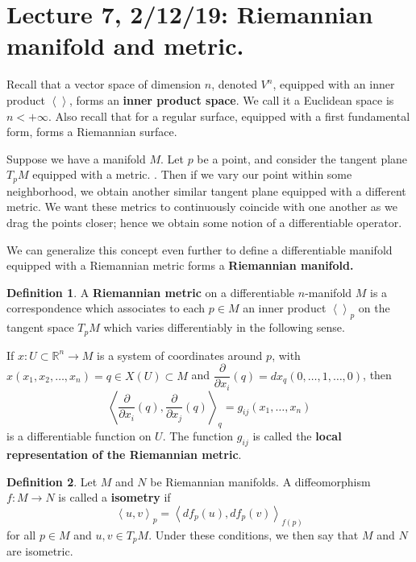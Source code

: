 \documentclass[12pt,letterpaper,boxed]{maths_v5}
\newcommand{\rr}{\mathbb{R}}
\theoremstyle{definition}
\newtheorem{definition}{Definition}[section]
\begin{document}
\section*{Lecture 7, 2/12/19: Riemannian manifold and metric.}
Recall that a vector space of dimension $n$, denoted 
$V^n$, equipped with an inner product $\left< \right>$, forms an \textbf{inner  product  space}. 
We  call it a Euclidean space is $n < +\infty$. Also recall that for a 
regular surface, equipped with a first fundamental form, forms a Riemannian 
surface. 

Suppose we have a manifold $M$. Let $p$ be a point, and consider the tangent 
plane $T_pM$ equipped with a metric. . Then if we vary our point within some neighborhood, we obtain 
another similar tangent plane equipped with a different metric. We want these metrics to 
continuously coincide with one another as we drag the points closer; hence we obtain some 
notion of a differentiable operator. 

We can generalize this concept even further to define a differentiable manifold equipped with 
a Riemannian metric forms a \textbf{Riemannian manifold.}


\begin{definition}
    A \textbf{Riemannian  metric} on a differentiable $n$-manifold $M$ is 
    a correspondence which associates to each $p\in M$ an inner product $\left<  \right>_p$ 
    on the tangent space $T_pM$ which varies differentiably 
    in the following sense. 

    If $x: U \subset \rr^n \to M$ is a system of coordinates around $p$, 
    with $x(x_1, x_2, \dots, x_n) = q \in X(U) \subset M$ 
    and $\dfrac{\partial}{\partial x_i}(q) = dx_q(0, \dots, 1, \dots, 0)$, 
    then 
    \[
        \left< \frac{\partial}{\partial x_i}(q),     \frac{\partial}{\partial x_j}(q) \right>_q
        =
        g_{ij}(x_1, \dots, x_n)
    \] 
    is a differentiable function on $U$. The function $g_{ij}$ is called the \textbf{local 
    representation of  the Riemannian metric}. 
\end{definition}

\begin{definition}
    Let $M$ and $N$ be Riemannian manifolds. A diffeomorphism $f:  M \to N$
    is called a \textbf{isometry} if  
    \[
        \left< u, v  \right>_p =\left<df_p(u), df_p(v) \right>_{f(p)}  
    \]
    for  all $p \in M$ and $u, v \in T_pM$. Under these conditions, we then 
    say that $M$ and $N$ are isometric. 
\end{definition}
\end{document}
